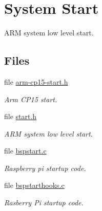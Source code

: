 \hypertarget{group__arm__start}{}\section{System Start}
\label{group__arm__start}


A\+RM system low level start.  


\subsection*{Files}
\begin{DoxyCompactItemize}
\item 
file \mbox{\hyperlink{arm-cp15-start_8h}{arm-\/cp15-\/start.\+h}}
\begin{DoxyCompactList}\small\item\em Arm C\+P15 start. \end{DoxyCompactList}\item 
file \mbox{\hyperlink{arm_2include_2bsp_2start_8h}{start.\+h}}
\begin{DoxyCompactList}\small\item\em A\+RM system low level start. \end{DoxyCompactList}\item 
file \mbox{\hyperlink{arm_2raspberrypi_2start_2bspstart_8c}{bspstart.\+c}}
\begin{DoxyCompactList}\small\item\em Raspberry pi startup code. \end{DoxyCompactList}\item 
file \mbox{\hyperlink{raspberrypi_2start_2bspstarthooks_8c}{bspstarthooks.\+c}}
\begin{DoxyCompactList}\small\item\em Rasberry Pi startup code. \end{DoxyCompactList}\end{DoxyCompactItemize}
